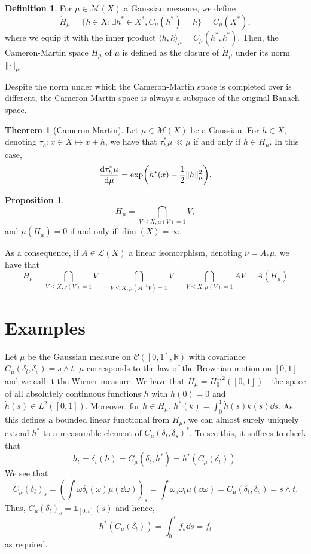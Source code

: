 \documentclass[]{article}
\theoremstyle{definition}
\newtheorem{theorem}{Theorem}
\theoremstyle{definition}
\newtheorem{definition}{Definition}[section]
\newtheorem{proposition}{Proposition}[section]
\begin{document}
\begin{definition}
  For \(\mu \in \mathcal{M}(X)\) a Gaussian measure, we define 
  \[\mathring H_\mu = \{h \in X : \exists h^* \in X^*, C_\mu(h^*) = h\} = C_\mu(X^*),\]
  where we equip it with the inner product \(\langle h, k\rangle_\mu = C_\mu(h^*, k^*)\). Then, the 
  Cameron-Martin space \(H_\mu\) of \(\mu\) is defined as the closure of \(\mathring H_\mu\) under 
  its norm \(\norm{\cdot}_\mu\).
\end{definition}

Despite the norm under which the Cameron-Martin space is completed over is different, the Cameron-Martin 
space is always a subspace of the original Banach space.

\begin{theorem}[Cameron-Martin]
  Let \(\mu \in \mathcal{M}(X)\) be a Gaussian.
  For \(h \in X\), denoting \(\tau_h : x \in X \mapsto x + h\), we have that \(\tau_h^* \mu \ll \mu\) if and only 
  if \(h \in H_\mu\). In this case, 
  \[\dv{\tau_h^* \mu}{\mu} = \exp(h^*(x) - \frac{1}{2}\|h\|^2_\mu).\]
\end{theorem}

\begin{proposition}
  \[H_\mu = \bigcap_{V \le X; \mu(V) = 1} V,\]
  and \(\mu(H_\mu) = 0\) if and only if \(\dim(X) = \infty\).
\end{proposition}

As a consequence, if \(A \in \mathcal{L}(X)\) a linear isomorphism, denoting \(\nu = A_* \mu\), 
we have that 
\[H_\nu = \bigcap_{V \le X; \nu(V) = 1} V = \bigcap_{V \le X; \mu(A^{-1}V) = 1} V = 
  \bigcap_{V \le X; \mu(V) = 1} AV = A(H_\mu)\]

\section*{Examples}

Let \(\mu\) be the Gaussian measure on \(\mathcal{C}([0, 1], \mathbb{R})\) with covariance 
\(C_\mu(\delta_t, \delta_s) = s \wedge t\). \(\mu\) corresponds to the law of the Brownian motion 
on \([0, 1]\) and we call it the Wiener measure. We have that \(H_\mu = H^{1, 2}_0([0, 1])\) - 
the space of all absolutely continuous functions \(h\) with \(h(0) = 0\) and \(\dot h(s) \in L^2([0, 1])\). Moreover, for \(h \in H_\mu\), 
\(h^*(k) = \int_0^1 \dot h(s) \dot k(s) \dd s\). As this defines a bounded linear functional from \(H_\mu\), 
we can almost surely uniquely extend \(h^*\) to a measurable element of \(C_\mu(\delta_t, \delta_s)^*\). To see this, it suffices to check that 
\[h_t = \delta_t(h) = C_\mu(\delta_t, h^*) = h^*(C_\mu(\delta_t)).\]
We see that 
\[C_\mu(\delta_t)_s = \left(\int \omega \delta_t(\omega) \mu(\dd \omega)\right)_s 
  = \int \omega_s \omega_t \mu(\dd \omega) = C_\mu(\delta_t, \delta_s) = s \wedge t.\]
Thus, \(\dot{C}_\mu(\delta_t)_s = \mathbb{1}_{[0, t]}(s)\) and hence,
\[h^*(C_\mu(\delta_t)) = \int_0^t \dot f_s \dd s = f_t\]
as required.
\end{document}
